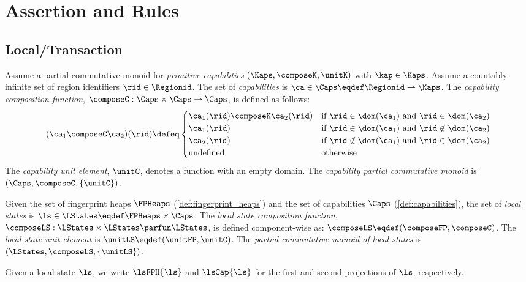 \section{Assertion and Rules\label{sec:assertion}}

\subsection{Local/Transaction}

\begin{definition}[capabilities]\label{def:capabilities}
Assume a partial commutative monoid for \emph{primitive capabilities} $(\Kaps, \composeK, \unitK)$ with $\kap \in \Kaps$.
Assume a countably infinite set of region identifiers $\rid \in \Regionid$. The set of \emph{capabilities} is $\ca \in \Caps \eqdef \Regionid \rightharpoonup \Kaps$.
The \emph{capability composition function}, $\composeC: \Caps \times \Caps \rightharpoonup \Caps$, is defined as follows:
%
\[
	(\ca_1 \composeC \ca_2)(\rid) \defeq 
	\begin{cases}
		\ca_1(\rid) \composeK \ca_2(\rid) & \text{if } \rid \in \dom(\ca_1) \text{ and } \rid \in \dom(\ca_2) \\
		\ca_1(\rid) & \text{if } \rid \in \dom(\ca_1) \text{ and } \rid \not\in \dom(\ca_2) \\
		\ca_2(\rid) & \text{if } \rid \not\in \dom(\ca_1) \text{ and } \rid \in \dom(\ca_2) \\
		\text{undefined} & \text{otherwise}
	\end{cases}
\]
%
The \emph{capability unit element}, $\unitC$, denotes a function with an empty domain.
The \emph{capability partial commutative monoid} is $(\Caps, \composeC, \{\unitC\})$. 
\end{definition}
%
%
\begin{definition}\label{def:local_state}
Given the set of fingerprint heaps $\FPHeaps$ (\ref{def:fingerprint_heaps}) and the set of capabilities $\Caps$ (\ref{def:capabilities}), the set of \emph{local states} is $\ls \in \LStates \eqdef \FPHeaps \times \Caps$.
The \emph{local state composition function}, $\composeLS: \LStates \times \LStates \parfun \LStates$, is defined component-wise as: $\composeLS \eqdef (\composeFP, \composeC)$.
The \emph{local state unit element} is $\unitLS \eqdef (\unitFP, \unitC)$.
The \emph{partial commutative monoid of local states} is $(\LStates, \composeLS, \{\unitLS\})$.
\end{definition}
%
Given a local state $\ls$, we write $\lsFPH{\ls}$ and $\lsCap{\ls}$ for the first and second projections of $\ls$, respectively.
